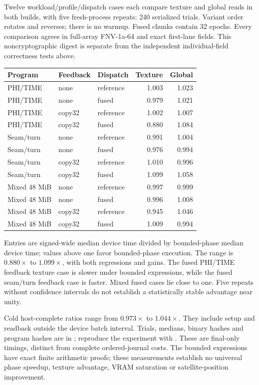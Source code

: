 Twelve workload/profile/dispatch cases each compare texture and global
reads in both builds, with five fresh-process repeats: 240 serialized
trials. Variant order rotates and reverses; there is no warmup. Fused chunks
contain 32 epochs. Every comparison agrees in full-array FNV-1a-64 and
exact first-lane fields. This noncryptographic digest is separate from the
independent individual-field correctness tests above.

\begin{center}\small
\begin{tabularx}{\linewidth}{@{}Y l l r r@{}}
\toprule Program & Feedback & Dispatch & Texture & Global\\\midrule
PHI/TIME & none & reference & 1.003 & 1.023\\
PHI/TIME & none & fused & 0.979 & 1.021\\
PHI/TIME & copy32 & reference & 1.002 & 1.007\\
PHI/TIME & copy32 & fused & 0.880 & 1.084\\
Seam/turn & none & reference & 0.991 & 1.004\\
Seam/turn & none & fused & 0.976 & 0.994\\
Seam/turn & copy32 & reference & 1.010 & 0.996\\
Seam/turn & copy32 & fused & 1.099 & 1.058\\
Mixed 48 MiB & none & reference & 0.997 & 0.999\\
Mixed 48 MiB & none & fused & 0.996 & 1.008\\
Mixed 48 MiB & copy32 & reference & 0.945 & 1.046\\
Mixed 48 MiB & copy32 & fused & 1.009 & 0.994\\
\bottomrule
\end{tabularx}
\end{center}

Entries are signed-wide median device time divided by bounded-phase
median device time; values above one favor bounded-phase execution. The
range is $0.880\times$ to $1.099\times$, with both regressions and gains.
The fused PHI/TIME feedback texture case is slower under bounded
expressions, while the fused seam/turn feedback case is faster. Mixed fused
cases lie close to one. Five repeats without confidence intervals do not
establish a statistically stable advantage near unity.

Cold host-complete ratios range from $0.973\times$ to $1.044\times$.
They include setup and readback outside the device batch interval. Trials,
medians, binary hashes and program hashes are in
; reproduce the experiment with
. These are final-only timings, distinct from
complete ordered-journal costs. The bounded expressions have exact finite
arithmetic proofs; these measurements establish no universal phase speedup,
texture advantage, VRAM saturation or satellite-position improvement.
\clearpage
